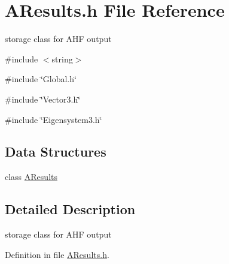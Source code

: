\section{AResults.h File Reference}
\label{AResults_8h}


storage class for AHF output  


{\ttfamily \#include $<$string$>$}\par
{\ttfamily \#include \char`\"{}Global.h\char`\"{}}\par
{\ttfamily \#include \char`\"{}Vector3.h\char`\"{}}\par
{\ttfamily \#include \char`\"{}Eigensystem3.h\char`\"{}}\par
\subsection*{Data Structures}
\begin{DoxyCompactItemize}
\item 
class \hyperlink{classAResults}{AResults}
\end{DoxyCompactItemize}


\subsection{Detailed Description}
storage class for AHF output 

Definition in file \hyperlink{AResults_8h_source}{AResults.h}.

